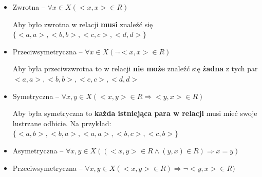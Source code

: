 \begin{itemize}
    \item Zwrotna -- $\forall x \in X (<x,x> \in R)$
    
    Aby było zwrotna w relacji \textbf{musi} znaleźć się $ \{ <a, a>, <b, b>, <c, c>, <d, d> \} $

    \item Przeciwsymetryczna -- $\forall x \in X(\neg <x, x> \in R) $
    
    Aby była przeciwzwrotna to w relacji \textbf{nie może} znaleźć się \textbf{żadna} z tych par \linebreak 
    $ <a, a>, <b,b>, <c,c>, <d,d> $
    
    \item Symetryczna -- $ \forall x, y \in X(<x,y> \in R \Rightarrow <y,x> \in R) $
    
    Aby była symetryczna to \textbf{każda istniejąca para w relacji} musi mieć swoje lustrzane odbicie. Na przykład:
    $ \{ <a,b>, <b,a>, <a, a>, <b,c>, <c,b> \} $

    \item Asymetryczna -- $\forall x,y \in X((<x,y> \in R \land (y,x) \in R) \Rightarrow x=y) $
    
    \item Przeciwsymetryczna -- $\forall x,y \in X(<x,y> \in R) \Rightarrow \neg <y,x> \in R) $
\end{itemize}